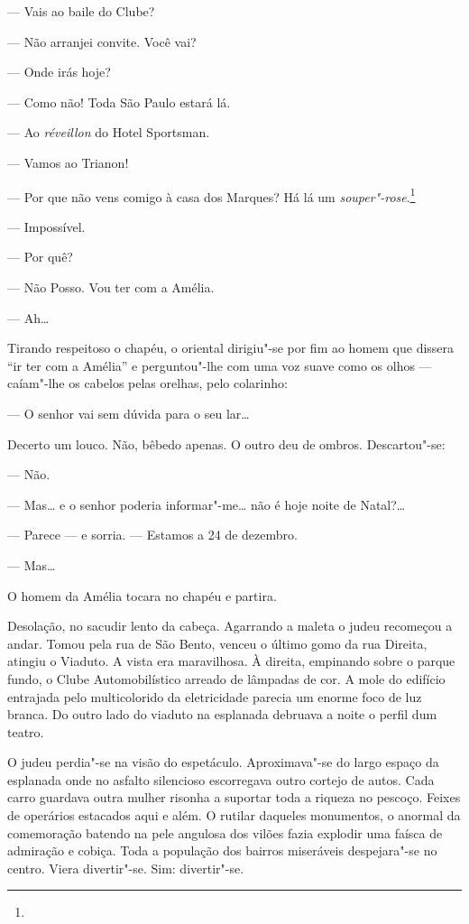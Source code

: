 --- Vais ao baile do Clube?

--- Não arranjei convite. Você vai?

--- Onde irás hoje?

--- Como não! Toda São Paulo estará lá.

--- Ao \emph{réveillon} do Hotel Sportsman.

--- Vamos ao Trianon!

--- Por que não vens comigo à casa dos Marques? Há lá um
\emph{souper"-rose}.\footnote{} %

--- Impossível.

--- Por quê?

--- Não Posso. Vou ter com a Amélia.

--- Ah\ldots{}

Tirando respeitoso o chapéu, o oriental dirigiu"-se por fim ao homem que
dissera ``ir ter com a Amélia'' e perguntou"-lhe com uma voz suave como
os olhos --- caíam"-lhe os cabelos pelas orelhas, pelo colarinho:

--- O senhor vai sem dúvida para o seu lar\ldots{}

Decerto um louco. Não, bêbedo apenas. O outro deu de ombros.
Descartou"-se:

--- Não.

--- Mas\ldots{} e o senhor poderia informar"-me\ldots{} não é hoje noite de
Natal?\ldots{}

--- Parece ­­--- e sorria. --- Estamos a 24 de dezembro.

--- Mas\ldots{}

O homem da Amélia tocara no chapéu e partira.

Desolação, no sacudir lento da cabeça. Agarrando a maleta o judeu
recomeçou a andar. Tomou pela rua de São Bento, venceu o último gomo da
rua Direita, atingiu o Viaduto. A vista era maravilhosa. À direita,
empinando sobre o parque fundo, o Clube Automobilístico arreado de
lâmpadas de cor. A mole do edifício entrajada pelo multicolorido da
eletricidade parecia um enorme foco de luz branca. Do outro lado do
viaduto na esplanada debruava a noite o perfil dum teatro.

O judeu perdia"-se na visão do espetáculo. Aproximava"-se do largo espaço
da esplanada onde no asfalto silencioso escorregava outro cortejo de
autos. Cada carro guardava outra mulher risonha a suportar toda a
riqueza no pescoço. Feixes de operários estacados aqui e além. O rutilar
daqueles monumentos, o anormal da comemoração batendo na pele angulosa
dos vilões fazia explodir uma faísca de admiração e cobiça. Toda a
população dos bairros miseráveis despejara"-se no centro. Viera divertir"-se. Sim: divertir"-se.

